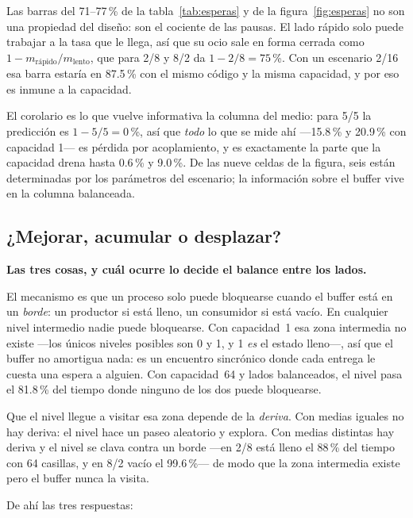 Las barras del 71--77\,\% de la tabla~\ref{tab:esperas} y de la
figura~\ref{fig:esperas} no son una propiedad del diseño: son el cociente de
las pausas. El lado rápido solo puede trabajar a la tasa que le llega, así
que su ocio sale en forma cerrada como $1 - m_{\text{rápido}}/m_{\text{lento}}$,
que para 2/8 y 8/2 da $1 - 2/8 = 75$\,\%. Con un escenario 2/16 esa barra
estaría en 87.5\,\% con el mismo código y la misma capacidad, y por eso es
inmune a la capacidad.

El corolario es lo que vuelve informativa la columna del medio: para 5/5 la
predicción es $1 - 5/5 = 0$\,\%, así que \emph{todo} lo que se mide ahí
---15.8\,\% y 20.9\,\% con capacidad 1--- es pérdida por acoplamiento, y es
exactamente la parte que la capacidad drena hasta 0.6\,\% y 9.0\,\%. De las
nueve celdas de la figura, seis están determinadas por los parámetros del
escenario; la información sobre el buffer vive en la columna balanceada.



\subsection{¿Mejorar, acumular o desplazar?}

\textbf{Las tres cosas, y cuál ocurre lo decide el balance entre los lados.}

El mecanismo es que un proceso solo puede bloquearse cuando el buffer está
en un \emph{borde}: un productor si está lleno, un consumidor si está vacío.
En cualquier nivel intermedio nadie puede bloquearse. Con capacidad~1 esa
zona intermedia no existe ---los únicos niveles posibles son 0 y 1, y 1
\emph{es} el estado lleno---, así que el buffer no amortigua nada: es un
encuentro sincrónico donde cada entrega le cuesta una espera a alguien. Con
capacidad~64 y lados balanceados, el nivel pasa el 81.8\,\% del tiempo donde
ninguno de los dos puede bloquearse.

Que el nivel llegue a visitar esa zona depende de la \emph{deriva}. Con
medias iguales no hay deriva: el nivel hace un paseo aleatorio y explora.
Con medias distintas hay deriva y el nivel se clava contra un borde ---en
2/8 está lleno el 88\,\% del tiempo con 64 casillas, y en 8/2 vacío el
99.6\,\%--- de modo que la zona intermedia existe pero el buffer nunca la
visita.

De ahí las tres respuestas:

